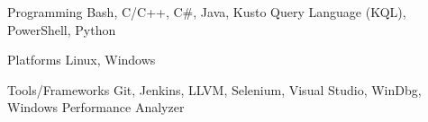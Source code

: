 
\begin{cvskills}

  \cvskill
    {Programming} %
    {Bash, C/C++, C\#, Java, Kusto Query Language (KQL), PowerShell, Python} %

  \cvskill
    {Platforms} %
    {Linux, Windows} %

  \cvskill
    {Tools/Frameworks} %
    {Git, Jenkins, LLVM, Selenium, Visual Studio, WinDbg, Windows Performance Analyzer} %

\end{cvskills}

